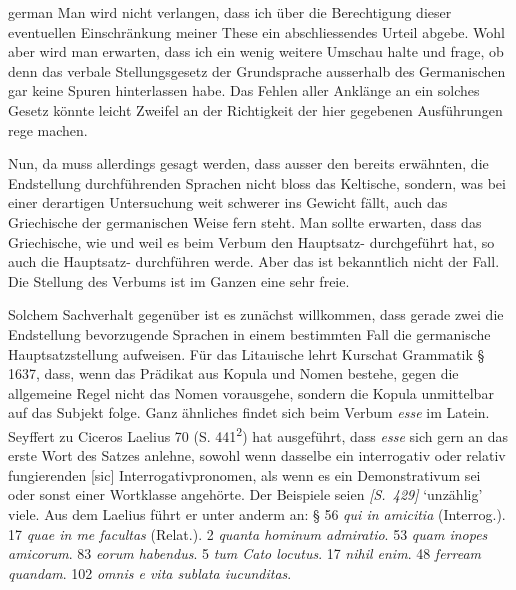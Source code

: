 \begin{otherlanguage*}{german}
Man wird nicht verlangen, dass ich über die Berechtigung dieser eventuellen Einschränkung meiner These ein abschliessendes Urteil abgebe. Wohl aber wird man erwarten, dass ich ein wenig weitere Umschau halte und frage, ob denn das verbale Stellungsgesetz der Grundsprache ausserhalb des Germanischen gar keine Spuren hinterlassen habe. Das Fehlen aller Anklänge an ein solches Gesetz könnte leicht Zweifel an der Richtigkeit der hier gegebenen Ausführungen rege machen.

Nun, da muss allerdings gesagt werden, dass ausser den bereits erwähnten, die Endstellung durchführenden Sprachen nicht bloss das Keltische, sondern, was bei einer derartigen Untersuchung weit schwerer ins Gewicht fällt, auch das Griechische der germanischen Weise fern steht. Man sollte erwarten, dass das Griechische, wie und weil es beim Verbum den Hauptsatz- durchgeführt hat, so auch die Hauptsatz- durchführen werde. Aber das ist bekanntlich nicht der Fall. Die Stellung des Verbums ist im Ganzen eine sehr freie.

Solchem Sachverhalt gegenüber ist es zunächst willkommen, dass gerade zwei die Endstellung bevorzugende Sprachen in einem bestimmten Fall die germanische Hauptsatzstellung aufweisen. Für das Litauische lehrt Kurschat Grammatik § 1637, dass, wenn das Prädikat aus Kopula und Nomen bestehe, gegen die allgemeine Regel nicht das Nomen vorausgehe, sondern die Kopula unmittelbar auf das Subjekt folge. Ganz ähnliches findet sich beim Verbum \emph{esse} im Latein. Seyffert zu Ciceros Laelius 70 (S. 441\textsuperscript{2}) hat ausgeführt, dass \emph{esse} sich gern an das erste Wort des Satzes anlehne, sowohl wenn dasselbe ein interrogativ oder relativ fungierenden [sic] Interrogativpronomen, als wenn es ein Demonstrativum sei oder sonst einer Wortklasse angehörte. Der Beispiele seien \hypertarget{p429}{\emph{[S.~429]}}\label{p429} ‘unzählig’ viele. Aus dem Laelius führt er unter anderm an: § 56 \emph{qui  in amicitia} (Interrog.). 17 \emph{quae  in me facultas} (Relat.). 2 \emph{quanta  hominum admiratio}. 53 \emph{quam  inopes amicorum}. 83 \emph{eorum  habendus}. 5 \emph{tum  Cato locutus}. 17 \emph{nihil  enim}. 48 \emph{ferream  quandam}. 102 \emph{omnis  e vita sublata iucunditas}.


\end{otherlanguage*}
